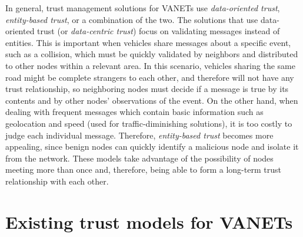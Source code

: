 In general, trust management solutions for VANETs use \textit{data-oriented trust}, \textit{entity-based trust}, or a combination of the two.
The solutions that use data-oriented trust (or \textit{data-centric trust}) \cite{raya2008data} focus on validating messages instead of entities.
This is important when vehicles share messages about a specific event, such as a collision, which must be quickly validated by neighbors and distributed to other nodes within a relevant area.
In this scenario, vehicles sharing the same road might be complete strangers to each other, and therefore will not have any trust relationship, so neighboring nodes must decide if a message is true by its contents and by other nodes' observations of the event.
On the other hand, when dealing with frequent messages which contain basic information such as geolocation and speed (used for traffic-diminishing solutions), it is too costly to judge each individual message.
Therefore, \textit{entity-based trust} becomes more appealing, since benign nodes can quickly identify a malicious node and isolate it from the network.
These models take advantage of the possibility of nodes meeting more than once and, therefore, being able to form a long-term trust relationship with each other.





\section{Existing trust models for VANETs}
 
